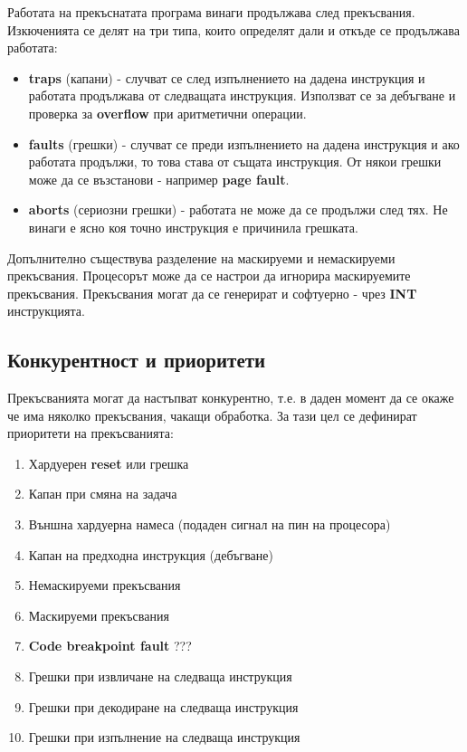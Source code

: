 \documentclass[fleqn,12pt]{article}
\begin{document}
Работата на прекъснатата програма винаги продължава след прекъсвания. Изкюченията се делят на три типа, 
които определят дали и откъде се продължава работата:
\begin{itemize}
    \item \textbf{traps} (капани) - случват се след изпълнението на дадена инструкция и работата продължава от следващата инструкция.
    Използват се за дебъгване и проверка за \textbf{overflow} при аритметични операции.
    \item \textbf{faults} (грешки) - случват се преди изпълнението на дадена инструкция и ако работата продължи, то това става 
    от същата инструкция. От някои грешки може да се възстанови - например \textbf{page fault}.
    \item \textbf{aborts} (сериозни грешки) - работата не може да се продължи след тях. Не винаги е ясно коя точно инструкция е причинила грешката.
\end{itemize}

Допълнително съществува разделение на маскируеми и немаскируеми прекъсвания. Процесорът може да се настрои да игнорира маскируемите прекъсвания.
Прекъсвания могат да се генерират и софтуерно - чрез \textbf{INT} инструкцията.

\subsection{Конкурентност и приоритети}
Прекъсванията могат да настъпват конкурентно, т.е. в даден момент да се окаже че има няколко прекъсвания, чакащи обработка.
За тази цел се дефинират приоритети на прекъсванията:
\begin{enumerate}
    \item Хардуерен \textbf{reset} или грешка
    \item Капан при смяна на задача
    \item Външна хардуерна намеса (подаден сигнал на пин на процесора)
    \item Капан на предходна инструкция (дебъгване)
    \item Немаскируеми прекъсвания
    \item Маскируеми прекъсвания
    \item \textbf{Code breakpoint fault} ???
    \item Грешки при извличане на следваща инструкция
    \item Грешки при декодиране на следваща инструкция
    \item Грешки при изпълнение на следваща инструкция
\end{enumerate}
\end{document}
